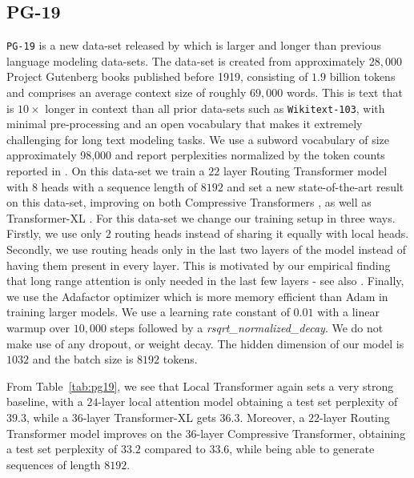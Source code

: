 \documentclass[a4paper]{article}
\begin{document}
\subsection{PG-19}\label{sec:pg19}
\texttt{PG-19} is a new data-set released by \citet{rae2020compressive}
which is larger and longer than previous language modeling data-sets.
The data-set is created from approximately \(28,000\) Project Gutenberg books published before 
1919, consisting of \(1.9\) billion tokens 
and comprises an average context size of roughly \(69,000\) words. This is text that is 
\(10\times\) longer in context than all prior data-sets such as \texttt{Wikitext-103}, with minimal pre-processing
and an open vocabulary that makes it extremely challenging for long text modeling tasks.
We use a subword vocabulary of size approximately 98,000 and report perplexities normalized
by the token counts reported in \citet{rae2020compressive}.
On this data-set we train a \(22\) layer Routing Transformer model with \(8\) heads with a 
sequence length of \(8192\)
and set a new state-of-the-art result on this data-set, improving on both Compressive 
Transformers 
\citep{rae2020compressive}, as well as Transformer-XL \citep{dai2019transformer}.
For this data-set we change our training setup in three ways. Firstly, we use only \(2\) routing heads instead of 
sharing it equally with local heads. Secondly, we use routing heads only in the last two layers of the model instead
of having them present in every layer. This is motivated by our empirical finding that long range attention is 
only needed in the last few layers - see also \citet{rae-razavi-2020-transformers}. Finally, we use
the Adafactor optimizer \citep{shazeer2018adafactor} which is more memory efficient than Adam 
in training larger models. We use a learning rate constant of \(0.01\) with a linear warmup over
\(10,000\) steps followed by a \emph{rsqrt_normalized_decay}. We do not make use of any dropout, or weight decay.
The hidden dimension of our model is \(1032\) and the batch size is \(8192\) tokens. 

From Table~\ref{tab:pg19}, we see that Local Transformer again sets a very strong baseline, with a \(24\)-layer
local attention model obtaining a test set perplexity of \(39.3\), while a \(36\)-layer Transformer-XL gets
\(36.3\). Moreover, a \(22\)-layer Routing Transformer model improves on the \(36\)-layer Compressive
Transformer, obtaining a test set perplexity of \(33.2\) compared to \(33.6\), 
while being able to generate sequences of length \(8192\).
\end{document}
